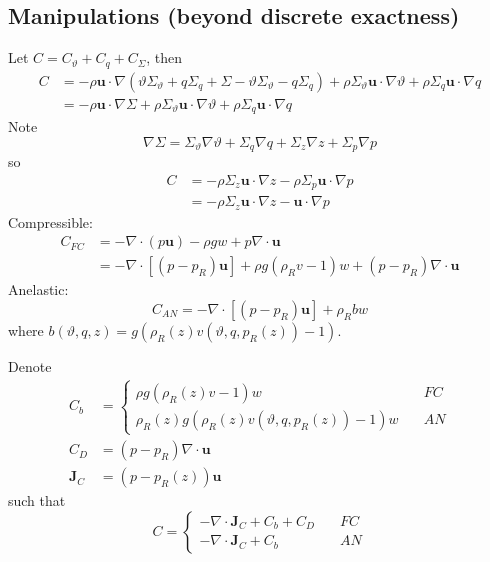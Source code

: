 \documentclass{article}
\begin{document}
\subsection{Manipulations (beyond discrete exactness)}
Let \(C = C_\vartheta + C_q + C_\Sigma\), then
\begin{align}
    C 
    & = 
    - \rho \mathbf{u} \cdot \nabla (
        \vartheta \Sigma_\vartheta
        + q \Sigma_q
        + \Sigma - \vartheta \Sigma_\vartheta - q \Sigma_q
        )
    + \rho \Sigma_\vartheta \mathbf{u} \cdot \nabla \vartheta
    + \rho \Sigma_q \mathbf{u} \cdot \nabla q
    \\
    & =
    - \rho \mathbf{u} \cdot \nabla \Sigma
    + \rho \Sigma_\vartheta \mathbf{u} \cdot \nabla \vartheta
    + \rho \Sigma_q \mathbf{u} \cdot \nabla q
\end{align}
Note
\begin{equation}
    \nabla \Sigma
    = 
    \Sigma_\vartheta \nabla \vartheta
    + \Sigma_q \nabla q
    + \Sigma_z \nabla z
    + \Sigma_p \nabla p
\end{equation}
so
\begin{align}
    C 
    & = 
    - \rho \Sigma_z \mathbf{u} \cdot \nabla z
    - \rho \Sigma_p \mathbf{u} \cdot \nabla p
    \\
    & = 
    - \rho \Sigma_z \mathbf{u} \cdot \nabla z
    - \mathbf{u} \cdot \nabla p
\end{align}
Compressible:
\begin{align}
    C_{FC}
    & =
    - \nabla\cdot (p \mathbf{u})
    - \rho g w 
    + p \nabla \cdot \mathbf{u}
    \\
    & =
    - \nabla \cdot \left[ (p - p_R) \mathbf{u} \right]
    + \rho g (\rho_R v - 1) w
    + (p - p_R) \nabla \cdot  \mathbf{u} 
\end{align}
Anelastic:
\begin{equation}
    C_{AN}
    =
    - \nabla \cdot \left[ (p - p_R) \mathbf{u} \right]
    + \rho_R bw
\end{equation}
where \(b(\vartheta, q, z) = g \left( \rho_R(z) v(\vartheta, q, p_R(z)) - 1 \right)\).

Denote
\begin{align}
    C_b
    & =
    \begin{cases}
        \rho g (\rho_R(z) v - 1)w
        \quad& FC
        \\
        \rho_R(z) g ( \rho_R(z) v(\vartheta, q, p_R(z)) - 1)w
        \quad& AN
    \end{cases}
    \\
    C_D
    & = 
    (p - p_R) \nabla \cdot \mathbf{u}
    \\
    \mathbf{J}_C 
    & = (p - p_R(z)) \mathbf{u}
\end{align}
such that
\begin{equation}
    C = 
    \begin{cases}
    - \nabla\cdot \mathbf{J}_C + C_b + C_D
    \quad & FC
    \\
    - \nabla\cdot \mathbf{J}_C + C_b
    \quad & AN
    \end{cases}
\end{equation}
\end{document}
